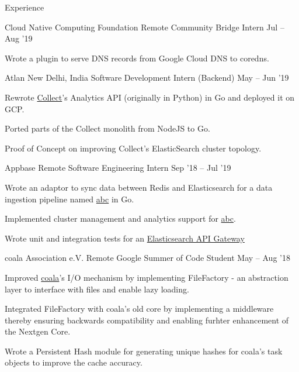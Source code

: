 \documentclass{resume} %
\begin{document}
\begin{rSection}{Experience}
  \begin{rWorkSection}{Cloud Native Computing Foundation}
                      {Remote}
                      {Community Bridge Intern}
                      {Jul -- Aug '19}
  {
    \item Wrote a plugin to serve DNS records from Google Cloud DNS to coredns.
  }
  \end{rWorkSection}

  \begin{rWorkSection}{Atlan}
                     {New Delhi, India}
                     {Software Development Intern (Backend)}
                     {May -- Jun '19}
  {
    \item Rewrote \href{https://collect.atlan.com/}{Collect}'s Analytics API (originally in Python) in Go and deployed it on GCP.
    \item Ported parts of the Collect monolith from NodeJS to Go.
    \item Proof of Concept on improving Collect's ElasticSearch cluster topology.
  }
  \end{rWorkSection}

  \begin{rWorkSection}{Appbase}
                     {Remote}
                     {Software Engineering Intern}
                     {Sep '18 -- Jul '19}
  {
    \item Wrote an adaptor to sync data between Redis and Elasticsearch for a data ingestion pipeline named \href{http://github.com/appbaseio/abc/}{abc} in Go.
    \item Implemented cluster management and analytics support for \href{http://github.com/appbaseio/abc/}{abc}.
    \item Wrote unit and integration tests for an \href{https://github.com/appbaseio/arc}{Elasticsearch API Gateway}
  }
  \end{rWorkSection}
  
  \begin{rWorkSection}{coala Association e.V.}
                     {Remote}
                     {Google Summer of Code Student}
                     {May -- Aug '18}
  {
    \item Improved \href{http://coala.io/}{coala}'s I/O mechanism by implementing FileFactory - an abstraction layer to interface with files and enable lazy loading.
    \item Integrated FileFactory with coala's old core by implementing a middleware thereby ensuring backwards compatibility and enabling furhter enhancement of the Nextgen Core.
    \item Wrote a Persistent Hash module for generating unique hashes for coala's task objects to improve the cache accuracy.
  }
  \end{rWorkSection}
\end{rSection}
\end{document}
